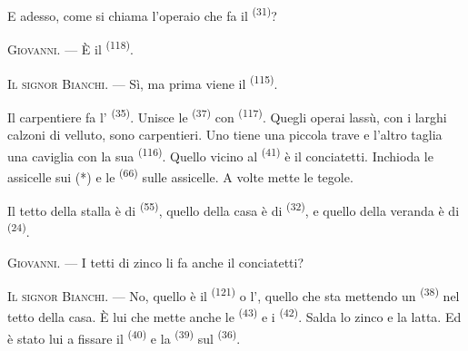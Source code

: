 E adesso, come si chiama l'operaio che fa il  \textsuperscript{(31)}?

\textsc{Giovanni}. --- È il  \textsuperscript{(118)}.

\VUsaut{3.0mm}
\VUsaut{3.0mm}

\textsc{Il signor Bianchi}. --- Sì, ma prima viene il 
\textsuperscript{(115)}.

Il carpentiere fa l' \textsuperscript{(35)}. Unisce le
 \textsuperscript{(37)} con  \textsuperscript{(117)}.
Quegli operai lassù, con i larghi calzoni di velluto, sono carpentieri. Uno tiene una
piccola trave e l'altro taglia una caviglia con la sua 
\textsuperscript{(116)}. Quello vicino al  \textsuperscript{(41)} è il
conciatetti. Inchioda le assicelle sui  (*) e le
 \textsuperscript{(66)} sulle assicelle. A volte mette le
tegole.


Il tetto della stalla è di  \textsuperscript{(55)}, quello della casa è
di  \textsuperscript{(32)}, e quello della veranda è di
 \textsuperscript{(24)}.

\textsc{Giovanni}. --- I tetti di zinco li fa anche il conciatetti?

\textsc{Il signor Bianchi}. --- No, quello è il 
\textsuperscript{(121)} o l', quello che sta mettendo un
 \textsuperscript{(38)} nel tetto della casa. È lui che mette anche le
 \textsuperscript{(43)} e i 
\textsuperscript{(42)}. Salda lo zinco e la latta. Ed è stato lui a fissare il
 \textsuperscript{(40)} e la 
\textsuperscript{(39)} sul  \textsuperscript{(36)}.

